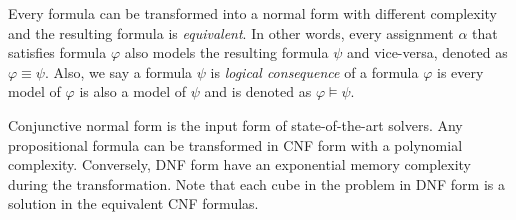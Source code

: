 Every formula can be transformed into a normal form with different complexity and the resulting formula is 
\emph{equivalent}.  
In other words, every assignment $\alpha$ that satisfies formula $\varphi$  also models the resulting formula $\psi$
and vice-versa, denoted as $\varphi \equiv \psi$.
 Also, we say a formula $\psi$ is \emph{logical consequence} of a formula $\varphi$ is every model of $\varphi$
 is also a model of $\psi$ and is denoted as $\varphi \models \psi$.

Conjunctive normal form is the input form of state-of-the-art solvers. Any propositional
formula can be transformed in CNF form with a polynomial complexity. Conversely, DNF form have
an exponential memory complexity during the transformation.
Note that each cube in the problem in DNF form is a solution in the equivalent CNF formulas.


